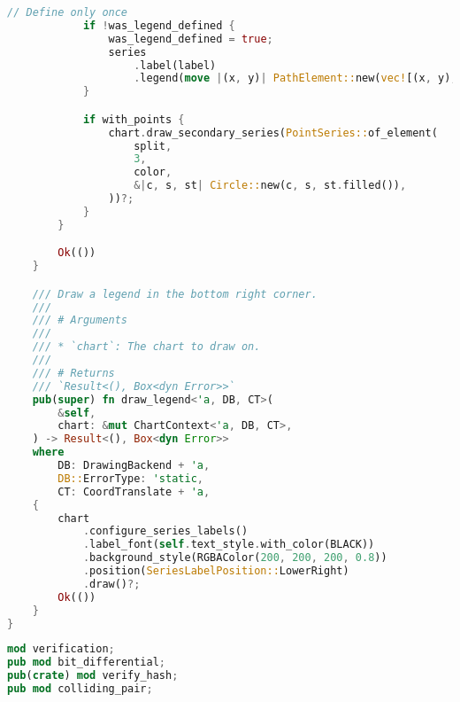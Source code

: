 \begin{lstlisting}[language=rust, caption={graphing/components.rs}]
			// Define only once
			if !was_legend_defined {
				was_legend_defined = true;
				series
					.label(label)
					.legend(move |(x, y)| PathElement::new(vec![(x, y), (x + 20, y)], color));
			}

			if with_points {
				chart.draw_secondary_series(PointSeries::of_element(
					split,
					3,
					color,
					&|c, s, st| Circle::new(c, s, st.filled()),
				))?;
			}
		}

		Ok(())
	}

	/// Draw a legend in the bottom right corner.
	///
	/// # Arguments
	///
	/// * `chart`: The chart to draw on.
	///
	/// # Returns
	/// `Result<(), Box<dyn Error>>`
	pub(super) fn draw_legend<'a, DB, CT>(
		&self,
		chart: &mut ChartContext<'a, DB, CT>,
	) -> Result<(), Box<dyn Error>>
	where
		DB: DrawingBackend + 'a,
		DB::ErrorType: 'static,
		CT: CoordTranslate + 'a,
	{
		chart
			.configure_series_labels()
			.label_font(self.text_style.with_color(BLACK))
			.background_style(RGBAColor(200, 200, 200, 0.8))
			.position(SeriesLabelPosition::LowerRight)
			.draw()?;
		Ok(())
	}
}
\end{lstlisting}

\begin{lstlisting}[language=rust, caption={verification/mod.rs}]
mod verification;
pub mod bit_differential;
pub(crate) mod verify_hash;
pub mod colliding_pair;
\end{lstlisting}

